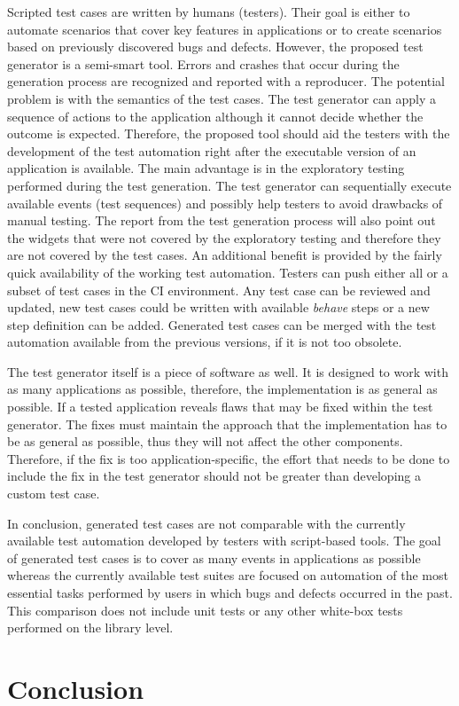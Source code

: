 Scripted test cases are written by humans (testers). Their goal is either to automate scenarios that cover key features in applications or to create scenarios based on previously discovered bugs and defects. However, the proposed test generator is a semi-smart tool. Errors and crashes that occur during the generation process are recognized and reported with a reproducer. The potential problem is with the semantics of the test cases. The test generator can apply a sequence of actions to the application although it cannot decide whether the outcome is expected. Therefore, the proposed tool should aid the testers with the development of the test automation right after the executable version of an application is available. The main advantage is in the exploratory testing performed during the test generation. The test generator can sequentially execute available events (test sequences) and possibly help testers to avoid drawbacks of manual testing. The report from the test generation process will also point out the widgets that were not covered by the exploratory testing and therefore they are not covered by the test cases. An additional benefit is provided by the fairly quick availability of the working test automation. Testers can push either all or a subset of test cases in the CI environment. Any test case can be reviewed and updated, new test cases could be written with available \textit{behave} steps or a new step definition can be added. Generated test cases can be merged with the test automation available from the previous versions, if it is not too obsolete.

The test generator itself is a piece of software as well. It is designed to work with as many applications as possible, therefore, the implementation is as general as possible. If a tested application reveals flaws that may be fixed within the test generator. The fixes must maintain the approach that the implementation has to be as general as possible, thus they will not affect the other components. Therefore, if the fix is too application-specific, the effort that needs to be done to include the fix in the test generator should not be greater than developing a custom test case.

In conclusion, generated test cases are not comparable with the currently available test automation developed by testers with script-based tools. The goal of generated test cases is to cover as many events in applications as possible whereas the currently available test suites are focused on automation of the most essential tasks performed by users in which bugs and defects occurred in the past. This comparison does not include unit tests or any other white-box tests performed on the library level.


\chapter{Conclusion}
